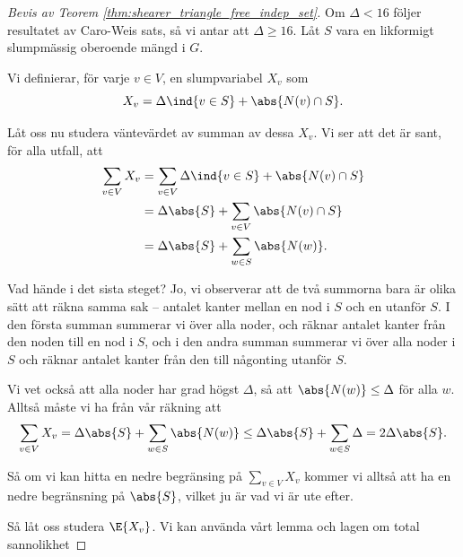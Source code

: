 \documentclass[nobib]{tufte-handout}
\begin{document}
\begin{proof}[Bevis av Teorem \ref{thm:shearer_triangle_free_indep_set}]
  Om $\Delta < 16$ följer resultatet av Caro-Weis sats, så vi antar att $\Delta \geq 16$. Låt $S$ vara en likformigt slumpmässig oberoende mängd i $G$.

  Vi definierar, för varje $v \in V$, en slumpvariabel $X_v$ som
  $$X_v = \Delta\ind{v \in S} + \abs{N(v) \cap S}.$$

  Låt oss nu studera väntevärdet av summan av dessa $X_v$. Vi ser att det är sant, för alla utfall, att
  \begin{align*}
    \sum_{v \in V} X_v &= \sum_{v \in V} \Delta\ind{v \in S} + \abs{N(v) \cap S}\\
    &= \Delta\abs{S} + \sum_{v \in V} \abs{N(v) \cap S}\\
    &= \Delta\abs{S} + \sum_{w \in S} \abs{N(w)}.
  \end{align*}

  Vad hände i det sista steget? Jo, vi observerar att de två summorna bara är olika sätt att räkna samma sak -- antalet kanter mellan en nod i $S$ och en utanför $S$. I den första summan summerar vi över alla noder, och räknar antalet kanter från den noden till en nod i $S$, och i den andra summan summerar vi över alla noder i $S$ och räknar antalet kanter från den till någonting utanför $S$.

  Vi vet också att alla noder har grad högst $\Delta$, så att $\abs{N(w)} \leq \Delta$ för alla $w$. Alltså måste vi ha från vår räkning att
  $$\sum_{v \in V} X_v = \Delta\abs{S} + \sum_{w \in S} \abs{N(w)} \leq \Delta\abs{S} + \sum_{w \in S} \Delta = 2\Delta\abs{S}.$$

  Så om vi kan hitta en nedre begränsing på $\sum_{v\in V} X_v$ kommer vi alltså att ha en nedre begränsning på $\abs{S}$, vilket ju är vad vi är ute efter.

  Så låt oss studera $\E{X_v}$. Vi kan använda vårt lemma och lagen om total sannolikhet 
\end{proof}
\end{document}
